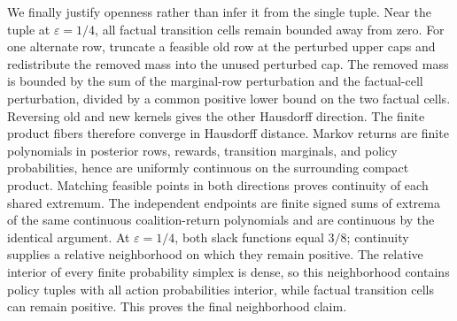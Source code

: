 We finally justify openness rather than infer it from the single tuple.  Near the tuple at \(\varepsilon=1/4\), all factual transition cells remain bounded away from zero.  For one alternate row, truncate a feasible old row at the perturbed upper caps and redistribute the removed mass into the unused perturbed cap.  The removed mass is bounded by the sum of the marginal-row perturbation and the factual-cell perturbation, divided by a common positive lower bound on the two factual cells.  Reversing old and new kernels gives the other Hausdorff direction.  The finite product fibers therefore converge in Hausdorff distance.  Markov returns are finite polynomials in posterior rows, rewards, transition marginals, and policy probabilities, hence are uniformly continuous on the surrounding compact product.  Matching feasible points in both directions proves continuity of each shared extremum.  The independent endpoints are finite signed sums of extrema of the same continuous coalition-return polynomials and are continuous by the identical argument.  At \(\varepsilon=1/4\), both slack functions equal \(3/8\); continuity supplies a relative neighborhood on which they remain positive.  The relative interior of every finite probability simplex is dense, so this neighborhood contains policy tuples with all action probabilities interior, while factual transition cells can remain positive.  This proves the final neighborhood claim.